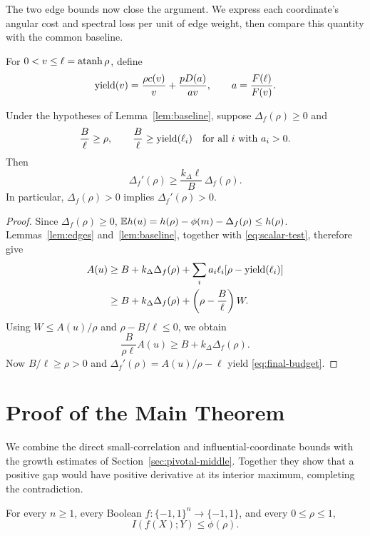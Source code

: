 The two edge bounds now close the argument. We express each coordinate's
angular cost and spectral loss per unit of edge weight, then compare this
quantity with the common baseline.

For \(0<v\le\ell=\operatorname{atanh}\rho\), define
\[
 \operatorname{yield}(v)=\frac{\rho c(v)}v+\frac{pD(a)}{av},
 \qquad a=\frac{F(\ell)}{F(v)}.
\]

\begin{lemma}\label{lem:budget}
Under the hypotheses of Lemma~\ref{lem:baseline}, suppose
\(\Delta_f(\rho)\ge0\) and
\begin{equation}
 \frac B\ell\ge\rho,\qquad
 \frac B\ell\ge\operatorname{yield}(\ell_i)
 \quad\text{for all }i\text{ with }a_i>0.
 \label{eq:scalar-test}
\end{equation}
Then
\begin{equation}
 \Delta_f'(\rho)\ge
 \frac{k_\Delta\ell}{B}\,\Delta_f(\rho).
 \label{eq:final-budget}
\end{equation}
In particular, \(\Delta_f(\rho)>0\) implies \(\Delta_f'(\rho)>0\).
\end{lemma}

\begin{proof}
Since \(\Delta_f(\rho)\ge0\),
\(\mathbb E h(u)=h(\rho)-\phi(m)-\Delta_f(\rho)\le h(\rho)\).
Lemmas~\ref{lem:edges} and~\ref{lem:baseline}, together with
\eqref{eq:scalar-test}, therefore give
\begin{align*}
 A(u)&\ge B+k_\Delta\Delta_f(\rho)
       +\sum_i a_i\ell_i[\rho-\operatorname{yield}(\ell_i)]\\
 &\ge B+k_\Delta\Delta_f(\rho)
       +\left(\rho-\frac B\ell\right)W.
\end{align*}
Using \(W\le A(u)/\rho\) and \(\rho-B/\ell\le0\), we obtain
\[
 \frac{B}{\rho\ell}A(u)\ge B+k_\Delta\Delta_f(\rho).
\]
Now \(B/\ell\ge\rho>0\) and
\(\Delta_f'(\rho)=A(u)/\rho-\ell\) yield
\eqref{eq:final-budget}.
\end{proof}

\section{Proof of the Main Theorem}
\label{sec:coverage}

We combine the direct small-correlation and influential-coordinate bounds
with the growth estimates of Section~\ref{sec:pivotal-middle}. Together
they show that a positive gap would have positive derivative at its
interior maximum, completing the contradiction.

\begin{theorem}
\label{thm:CK}
For every \(n\ge1\), every Boolean
\(f:\{-1,1\}^n\to\{-1,1\}\), and every \(0\le\rho\le1\),
\begin{equation}
 I(f(X);Y)\le\phi(\rho).
 \label{eq:main-ck-sign}
\end{equation}
\end{theorem}

